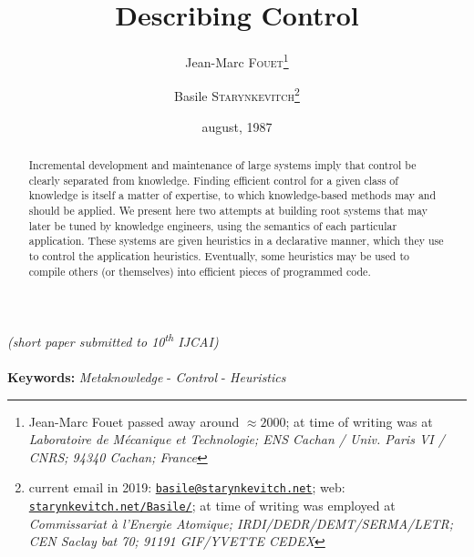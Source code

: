\documentclass[11pt,a4paper,svgnames]{article}
\begin{document}


\date{august, 1987}

\title{Describing Control}

\author{Jean-Marc \textsc{Fouet}\thanks{Jean-Marc Fouet passed away
    around $\approx 2000$; at time of writing was at \emph{Laboratoire de
      Mécanique et Technologie; ENS Cachan / Univ. Paris VI / CNRS;
      94340 Cachan; France}}
\and
Basile \textsc{Starynkevitch}\thanks{current email in 2019:
    \href{mailto:basile@starynkevitch.net}{\texttt{basile@starynkevitch.net}};
    web:
    \href{http://starynkevitch.net/Basile/}{\texttt{starynkevitch.net/Basile/}};
    at time of writing was employed at \emph{Commissariat à l'Energie
      Atomique; IRDI/DEDR/DEMT/SERMA/LETR; CEN Saclay bat 70; 91191
      GIF/YVETTE CEDEX}}}

  \begin{titlepage}
    \maketitle
  \end{titlepage}

  \begin{center}
    \emph{(short paper submitted to 10\textsuperscript{th} IJCAI)}\\
      {}\\
    \textbf{Keywords:} \emph{Metaknowledge} - \emph{Control} - \emph{Heuristics}
  \end{center}

  \begin{abstract}
    Incremental development and maintenance of large systems imply that control
    be clearly separated from knowledge. Finding efficient control for a given
    class of knowledge is itself a matter of expertise, to which knowledge-based
    methods may and should be applied. We present here two attempts at building
    root systems that may later be tuned by knowledge engineers, using the
    semantics of each particular application. These systems are given heuristics
    in a declarative manner, which they use to control the application heuristics.
    Eventually, some heuristics may be used to compile others (or themselves) into
    efficient pieces of programmed code.
  \end{abstract}
\end{document}
